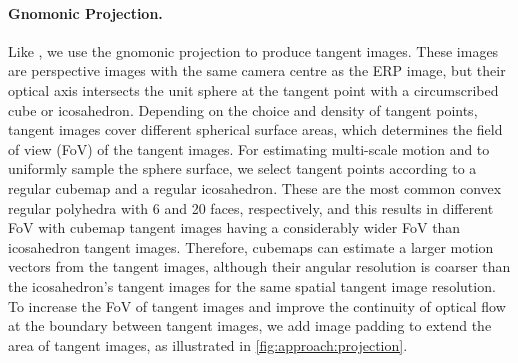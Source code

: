 \paragraph{Gnomonic Projection.}
%
Like \citet{ZhaoYZLBT2020}, we use the gnomonic projection to produce tangent images.
These images are perspective images with the same camera centre as the ERP image, but their optical axis intersects the unit sphere at the tangent point with a circumscribed cube or icosahedron.
%
Depending on the choice and density of tangent points, tangent images cover different spherical surface areas, which determines the field of view (FoV) of the tangent images.
%
For estimating multi-scale motion and to uniformly sample the sphere surface, we select tangent points according to a regular cubemap and a regular icosahedron.
These are the most common convex regular polyhedra with 6 and 20 faces, respectively, and this results in different FoV with cubemap tangent images having a considerably wider FoV than icosahedron tangent images.
%
Therefore, cubemaps can estimate a larger motion vectors from the tangent images, although their angular resolution is coarser than the icosahedron's tangent images for the same spatial tangent image resolution.
%
To increase the FoV of tangent images and improve the continuity of optical flow at the boundary between tangent images, we add image padding to extend the area of tangent images, as illustrated in \cref{fig:approach:projection}.


